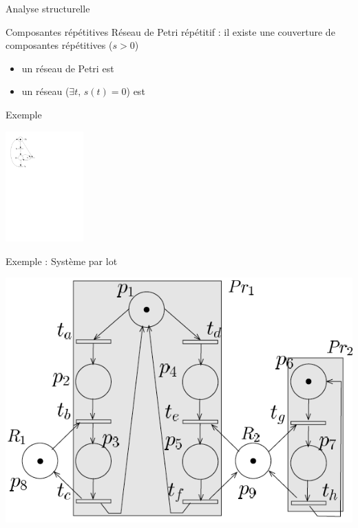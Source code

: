 \documentclass[compress]{beamer}
\begin{document}
\begin{frame}{Analyse structurelle}
\begin{block}{Composantes répétitives}
Réseau de Petri répétitif : il existe une couverture de composantes répétitives ($s>0$)
	\begin{itemize}
	\item un réseau de Petri  est 
	\item un réseau  ($\exists t, \, s(t)=0$) est 
	\end{itemize}
\end{block}
\end{frame}  
   
\begin{frame}{Exemple}
\begin{center}
	\includegraphics[width=3cm]{exemplea} 
\end{center}
\end{frame}

\begin{frame}{Exemple : Système par lot}
\begin{center}
	\includegraphics[width=.8\linewidth]{rea1}
\end{center}
\end{frame}
\end{document}
